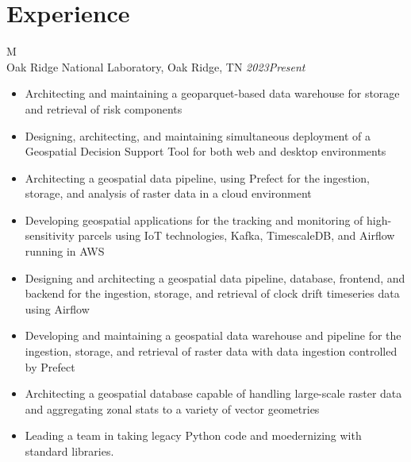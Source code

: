 \documentclass[10pt]{article}%
\begin{document}
    \section*{\faCalendar{} Experience}
    \begin{tabularx}{\linewidth}{M}%
         \\
        Oak Ridge National Laboratory, Oak Ridge, TN \textit{2023\textemdash{}Present} \\
        \begin{itemize}[topsep=-12pt,parsep=0em]
            \setlength\itemsep{0em}
            \item Architecting and maintaining a geoparquet-based data warehouse for storage and retrieval of risk components %
            \item Designing, architecting, and maintaining simultaneous deployment of a Geospatial Decision Support Tool for both web and desktop environments %
            \item Architecting a geospatial data pipeline, using Prefect for the ingestion, storage, and analysis of raster data in a cloud environment %
            \item Developing geospatial applications for the tracking and monitoring of high-sensitivity parcels using IoT technologies, Kafka, TimescaleDB, and Airflow running in AWS %
            \item Designing and architecting a geospatial data pipeline, database, frontend, and backend for the ingestion, storage, and retrieval of clock drift timeseries data using Airflow %
            \item Developing and maintaining a geospatial data warehouse and pipeline for the ingestion, storage, and retrieval of raster data with data ingestion controlled by Prefect %
            \item Architecting a geospatial database capable of handling large-scale raster data and aggregating zonal stats to a variety of vector geometries %
            \item Leading a team in taking legacy Python code and moedernizing  with standard libraries.
        \end{itemize} \\
    \end{tabularx}
\end{document}

